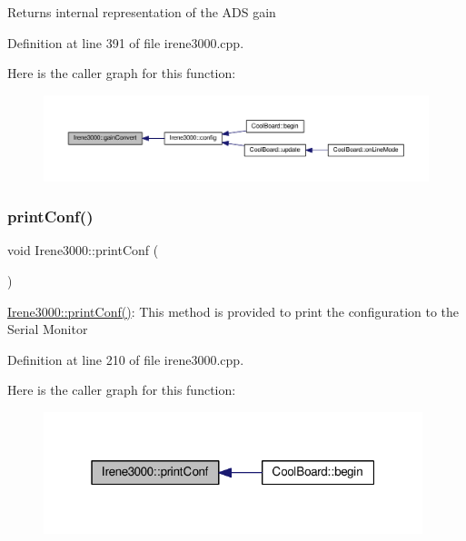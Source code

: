 \begin{DoxyReturn}{Returns}
internal representation of the A\+DS gain 
\end{DoxyReturn}


Definition at line 391 of file irene3000.\+cpp.

Here is the caller graph for this function\+:
\nopagebreak
\begin{figure}[H]
\begin{center}
\leavevmode
\includegraphics[width=350pt]{d6/d03/class_irene3000_abcad62d1201a59f8dd3ba87048002728_icgraph}
\end{center}
\end{figure}
\mbox{\label{class_irene3000_a7bc2414100b5e19eacc6630fa34b2654}} 
\subsubsection{\texorpdfstring{print\+Conf()}{printConf()}}
{\footnotesize\ttfamily void Irene3000\+::print\+Conf (\begin{DoxyParamCaption}{ }\end{DoxyParamCaption})}

\hyperlink{class_irene3000_a7bc2414100b5e19eacc6630fa34b2654}{Irene3000\+::print\+Conf()}\+: This method is provided to print the configuration to the Serial Monitor 

Definition at line 210 of file irene3000.\+cpp.

Here is the caller graph for this function\+:
\nopagebreak
\begin{figure}[H]
\begin{center}
\leavevmode
\includegraphics[width=313pt]{d6/d03/class_irene3000_a7bc2414100b5e19eacc6630fa34b2654_icgraph}
\end{center}
\end{figure}
\mbox{\label{class_irene3000_a852a170feea994ea1df01c6b245b5d9a}} 
